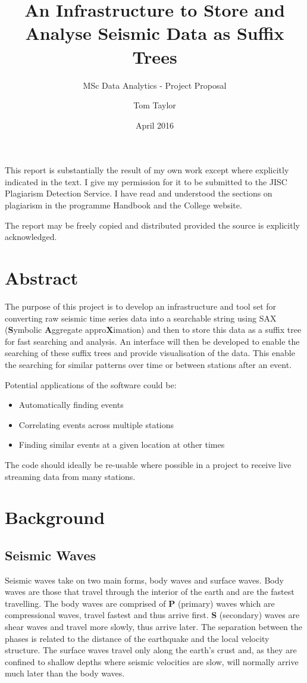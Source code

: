 \documentclass[11pt]{scrartcl}
\title{An Infrastructure to Store and Analyse Seismic Data as Suffix Trees}
\subtitle{MSc Data Analytics - Project Proposal}
\date{April 2016}
\author{Tom Taylor}
\begin{document}
\maketitle
\begin{itshape}
	\noindent This report is substantially the result of my own work except where explicitly indicated in the text. I give my permission for it to be submitted to the JISC Plagiarism Detection Service. I have read and understood the sections on plagiarism in the programme Handbook and the College website.
	
	\noindent The report may be freely copied and distributed provided the source is explicitly acknowledged.
\end{itshape}

\tableofcontents

\newpage

\section{Abstract}
	The purpose of this project is to develop an infrastructure and tool set for converting raw seismic time series data into a searchable string using SAX (\textbf{S}ymbolic \textbf{A}ggregate appro\textbf{X}imation) and then to store this data as a suffix tree for fast searching and analysis.  An interface will then be developed to enable the searching of these suffix trees and provide visualisation of the data.  This enable the searching for similar patterns over time or between stations after an event.
	
	\noindent Potential applications of the software could be:
	\begin{itemize}
		\item Automatically finding events
		\item Correlating events across multiple stations
		\item Finding similar events at a given location at other times
	\end{itemize}
	
	The code should ideally be re-usable where possible in a project to receive live streaming data from many stations.
	
\section{Background}
\subsection{Seismic Waves}
	Seismic waves take on two main forms, body waves and surface waves.  Body waves are those that travel through the interior of the earth and are the fastest travelling.  The body waves are comprised of \textbf{P} (primary) waves which are compressional waves, travel fastest and thus arrive first.  \textbf{S} (secondary) waves are shear waves and travel more slowly, thus arrive later.  The separation between the phases is related to the distance of the earthquake and the local velocity structure. The surface waves travel only along the earth’s crust and, as they are confined to shallow depths where seismic velocities are slow, will normally arrive much later than the body waves.
	
\end{document}
